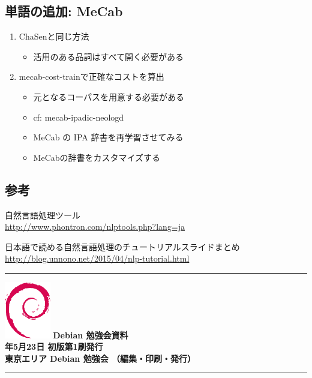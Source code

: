 \documentclass[mingoth,a4paper]{jsarticle}
\newcommand{\debmtgyear}{2015}
\newcommand{\debmtgmonth}{5}
\newcommand{\debmtgdate}{23}
\begin{document}
\subsection{単語の追加: MeCab}

\begin{enumerate}
\item ChaSenと同じ方法
  \begin{itemize}
  \item 活用のある品詞はすべて開く必要がある
  \end{itemize}
\item mecab-cost-trainで正確なコストを算出
  \begin{itemize}
  \item 元となるコーパスを用意する必要がある
  \item cf: mecab-ipadic-neologd
  \item MeCab の IPA 辞書を再学習させてみる
  \item MeCabの辞書をカスタマイズする
  \end{itemize}
\end{enumerate}

\subsection{参考}

 自然言語処理ツール\\
\url{http://www.phontron.com/nlptools.php?lang=ja}

 日本語で読める自然言語処理のチュートリアルスライドまとめ\\
\url{http://blog.unnono.net/2015/04/nlp-tutorial.html}

\newpage

\vspace*{15cm}
\hrule
\vspace{2mm}
\includegraphics[width=2cm]{image200502/openlogo-nd.eps}
\noindent \Large \bf Debian 勉強会資料\\
\noindent \normalfont \debmtgyear{}年\debmtgmonth{}月\debmtgdate{}日 \hspace{5mm}  初版第1刷発行\\
\noindent \normalfont 東京エリア Debian 勉強会 （編集・印刷・発行）\\
\hrule
\end{document}
